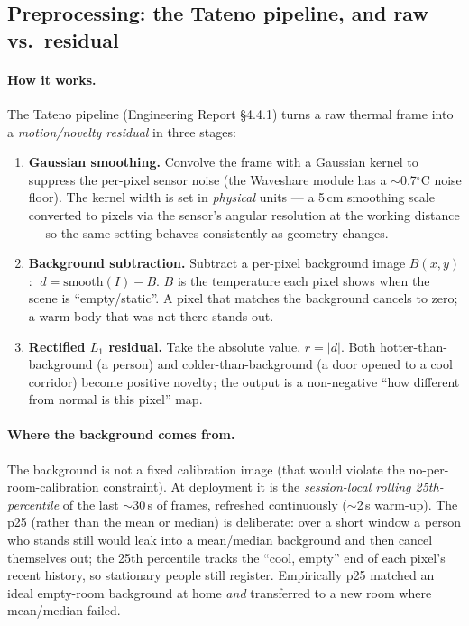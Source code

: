 \documentclass[11pt]{article}
\begin{document}
\subsection{Preprocessing: the Tateno pipeline, and raw vs.\ residual}
\label{sec:tateno}

\paragraph{How it works.}
The Tateno pipeline (Engineering Report \S4.4.1) turns a raw thermal frame
into a \emph{motion/novelty residual} in three stages:
\begin{enumerate}
\item \textbf{Gaussian smoothing.} Convolve the frame with a Gaussian
      kernel to suppress the per-pixel sensor noise (the Waveshare module
      has a $\sim$0.7$^\circ$C noise floor). The kernel width is set in
      \emph{physical} units --- a 5\,cm smoothing scale converted to pixels
      via the sensor's angular resolution at the working distance --- so the
      same setting behaves consistently as geometry changes.
\item \textbf{Background subtraction.} Subtract a per-pixel background image
      $B(x,y)$: $\;d = \text{smooth}(I) - B$. $B$ is the temperature each
      pixel shows when the scene is ``empty/static''. A pixel that matches
      the background cancels to zero; a warm body that was not there stands
      out.
\item \textbf{Rectified $L_1$ residual.} Take the absolute value,
      $r = |d|$. Both hotter-than-background (a person) and
      colder-than-background (a door opened to a cool corridor) become
      positive novelty; the output is a non-negative ``how different from
      normal is this pixel'' map.
\end{enumerate}

\paragraph{Where the background comes from.}
The background is not a fixed calibration image (that would violate the
no-per-room-calibration constraint). At deployment it is the
\emph{session-local rolling 25th-percentile} of the last $\sim$30\,s of
frames, refreshed continuously ($\sim$2\,s warm-up). The p25 (rather than
the mean or median) is deliberate: over a short window a person who stands
still would leak into a mean/median background and then cancel themselves
out; the 25th percentile tracks the ``cool, empty'' end of each pixel's
recent history, so stationary people still register. Empirically p25
matched an ideal empty-room background at home \emph{and} transferred to a
new room where mean/median failed.
\end{document}
